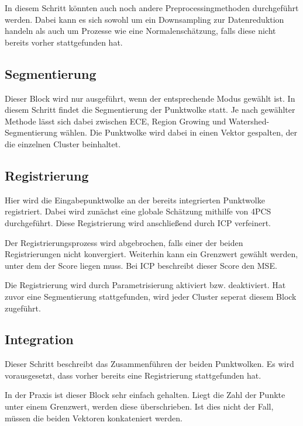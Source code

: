 In diesem Schritt könnten auch noch andere Preprocessingmethoden durchgeführt werden.
Dabei kann es sich sowohl um ein Downsampling zur Datenreduktion handeln als auch um Prozesse wie eine Normalenschätzung, falls diese nicht bereits vorher stattgefunden hat.

\subsection{Segmentierung}
\label{subsec:pipeline-segmentierung}

Dieser Block wird nur ausgeführt, wenn der entsprechende Modus gewählt ist.
In diesem Schritt findet die Segmentierung der Punktwolke statt.
Je nach gewählter Methode lässt sich dabei zwischen \ac{ECE}, Region Growing und Watershed-Segmentierung wählen.
Die Punktwolke wird dabei in einen Vektor gespalten, der die einzelnen Cluster beinhaltet.

\subsection{Registrierung}
\label{subsec:pipeline-registrierung}

Hier wird die Eingabepunktwolke an der bereits integrierten Punktwolke registriert.
Dabei wird zunächst eine globale Schätzung mithilfe von \ac{4PCS} durchgeführt.
Diese Registrierung wird anschließend durch \ac{ICP} verfeinert.

Der Registrierungsprozess wird abgebrochen, falls einer der beiden Registrierungen nicht konvergiert.
Weiterhin kann ein Grenzwert gewählt werden, unter dem der Score liegen muss.
Bei \ac{ICP} beschreibt dieser Score den \ac{MSE}.

Die Registrierung wird durch Parametrisierung aktiviert bzw. deaktiviert.
Hat zuvor eine Segmentierung stattgefunden, wird jeder Cluster seperat diesem Block zugeführt.

\subsection{Integration}
\label{subsec:pipeline-integration}

Dieser Schritt beschreibt das Zusammenführen der beiden Punktwolken.
Es wird vorausgesetzt, dass vorher bereits eine Registrierung stattgefunden hat.

In der Praxis ist dieser Block sehr einfach gehalten.
Liegt die Zahl der Punkte unter einem Grenzwert, werden diese überschrieben.
Ist dies nicht der Fall, müssen die beiden Vektoren konkateniert werden.

